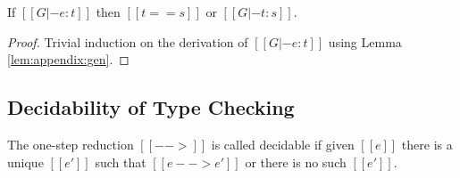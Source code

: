 \begin{lemma}\label{lem:appendix:corrtyp}
    If $[[G |- e:t]]$ then $[[t == s]]$ or $[[G |- t : s]]$.
\end{lemma}

\begin{proof}
    Trivial induction on the derivation of $[[G |- e:t]]$ using Lemma
\ref{lem:appendix:gen}.
\end{proof}

\subsection{Decidability of Type Checking}
\begin{lemma}\label{lem:appendix:unired}
	The one-step reduction $[[-->]]$ is called decidable if 
given $[[e]]$ there is a unique $[[e']]$ such that $[[e --> e']]$ or there is no such $[[e']]$.
\end{lemma}

